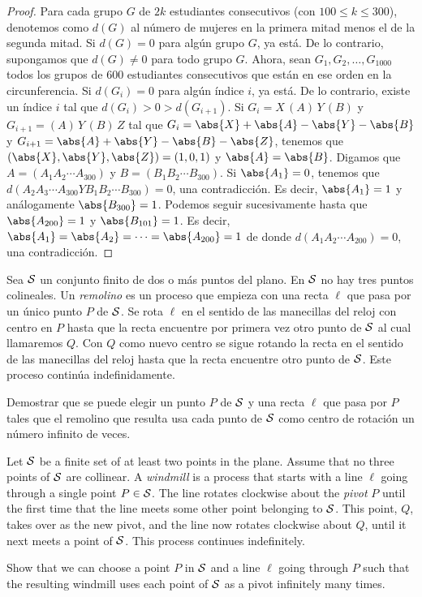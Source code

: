 \begin{proof}
	Para cada grupo $G$ de $2k$ estudiantes consecutivos (con $100\le k\le 300$), denotemos como $d(G)$ al número de mujeres en la primera mitad menos el de la segunda mitad. Si $d(G)=0$ para algún grupo $G$, ya está. De lo contrario, supongamos que $d(G)\ne 0$ para todo grupo $G$. Ahora, sean $G_1,G_2,\dots,G_{1000}$ todos los grupos de $600$ estudiantes consecutivos que están en ese orden en la circunferencia. Si $d(G_i)=0$ para algún índice $i$, ya está. De lo contrario, existe un índice $i$ tal que $d(G_i)>0>d(G_{i+1})$. Si $G_i=X\,(A)\,Y\,(B)$ y $G_{i+1}=(A)\,Y\,(B)\,Z$ tal que $G_i=\abs{X}+\abs{A}-\abs{Y}-\abs{B}$ y $G_{i+1}=\abs{A}+\abs{Y}-\abs{B}-\abs{Z}$, tenemos que $(\abs{X},\abs{Y},\abs{Z})=(1,0,1)$ y $\abs{A}=\abs{B}$. Digamos que $A=(A_1A_2\cdots A_{300})$ y $B=(B_1B_2\cdots B_{300})$. Si $\abs{A_1}=0$, tenemos que $d(A_2A_3\cdots A_{300}YB_1B_2\cdots B_{300})=0$, una contradicción. Es decir, $\abs{A_1}=1$ y análogamente $\abs{B_{300}}=1$. Podemos seguir sucesivamente hasta que $\abs{A_{200}}=1$ y $\abs{B_{101}}=1$. Es decir, $\abs{A_1}=\abs{A_2}=\dots=\abs{A_{200}}=1$ de donde $d(A_1A_2\cdots A_{200})=0$, una contradicción.
\end{proof}

\begin{probMG}[ISL 2011/C3\protect\footnote{IMO 2011/2; como referencia un video de 3Blue1Brown: \url{https://www.youtube.com/watch?v=M64HUIJFTZM}.}]
	Sea $\cal S$ un conjunto finito de dos o más puntos del plano. En $\cal S$ no hay tres puntos colineales. Un \emph{remolino} es un proceso que empieza con una recta $\ell$ que pasa por un único punto $P$ de $\cal S$. Se rota $\ell$ en el sentido de las manecillas del reloj con centro en $P$ hasta que la recta encuentre por primera vez otro punto de $\cal S$ al cual llamaremos $Q$. Con $Q$ como nuevo centro se sigue rotando la recta en el sentido de las manecillas del reloj hasta que la recta encuentre otro punto de $\cal S$. Este proceso continúa indefinidamente.

	Demostrar que se puede elegir un punto $P$ de $\cal S$ y una recta $\ell$ que pasa por $P$ tales que el remolino que resulta usa cada punto de $\cal S$ como centro de rotación un número infinito de veces.
	\begin{hint}
		Let $\cal S$ be a finite set of at least two points in the plane. Assume that no three points of $\cal S$ are collinear. A \emph{windmill} is a process that starts with a line $\ell$ going through a single point $P\in\cal S$. The line rotates clockwise about the \emph{pivot} $P$ until the first time that the line meets some other point belonging to $\cal S$. This point, $Q$, takes over as the new pivot, and the line now rotates clockwise about $Q$, until it next meets a point of $\cal S$. This process continues indefinitely.

		Show that we can choose a point $P$ in $\cal S$ and a line $\ell$ going through $P$ such that the resulting windmill uses each point of $\cal S$ as a pivot infinitely many times.
	\end{hint}
\end{probMG}

